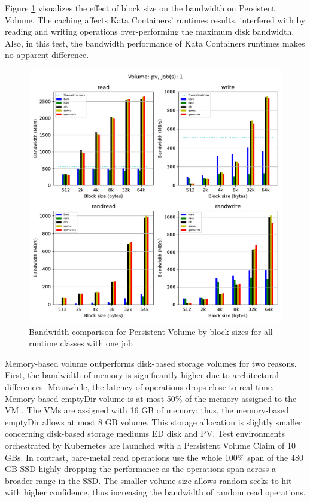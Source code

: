 Figure \ref{fig:ResultsPVByBS-1} visualizes the effect of block size on the bandwidth on Persistent Volume. The caching affects Kata Containers' runtimes results, interfered with by reading and writing operations over-performing the maximum disk bandwidth. Also, in this test, the bandwidth performance of Kata Containers runtimes makes no apparent difference.

\begin{figure}[ht]
  \begin{center}
    \includegraphics[width=12cm]{results/subplot_bw_by_bs_with_bare(pv,1).pdf}
    \caption{Bandwidth comparison for Persistent Volume by block sizes for all runtime classes with one job}
    \label{fig:ResultsPVByBS-1}
  \end{center}
\end{figure}

Memory-based volume outperforms disk-based storage volumes for two reasons. First, the bandwidth of memory is significantly higher due to architectural differences. Meanwhile, the latency of operations drops close to real-time. Memory-based emptyDir volume is at most 50\% of the memory assigned to the VM \cite{VolumesKubernetes}. The VMs are assigned with 16 GB of memory; thus, the memory-based emptyDir allows at most 8 GB volume. This storage allocation is slightly smaller concerning disk-based storage mediums ED disk and PV. Test environments orchestrated by Kubernetes are launched with a Persistent Volume Claim of 10 GBs. In contrast, bare-metal read operations use the whole 100\% span of the 480 GB SSD \cite{IntelSSD} highly dropping the performance as the operations span across a broader range in the SSD. The smaller volume size allows random seeks to hit with higher confidence, thus increasing the bandwidth of random read operations.

